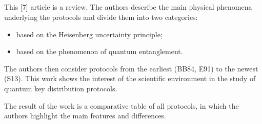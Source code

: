 \subsection{\review}
This [7] article is a review. The authors describe the main physical phenomena underlying the protocols and divide them into two categories:
\begin{itemize}
	\item based on the Heisenberg uncertainty principle;
	\item based on the phenomenon of quantum entanglement.
\end{itemize}

The authors then consider protocols from the earliest (BB84, E91) to the newest (S13). This work shows the interest of the scientific environment in the study of quantum key distribution protocols.

The result of the work is a comparative table of all protocols, in which the authors highlight the main features and differences.


\subsection{\dic}
